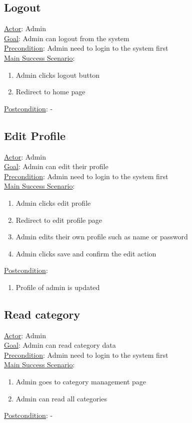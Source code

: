 \documentclass[12pt,oneside,openright,a4paper]{cpe-english-project}
\begin{document}
\subsection{Logout}
\underline{Actor}: Admin\\
\underline{Goal}: Admin can logout from the system\\
\underline{Precondition}: Admin need to login to the system first\\
\underline{Main Success Scenario}:
\begin{enumerate}[label={\arabic*.}]
	\item Admin clicks logout button      
	\item Redirect to home page
\end{enumerate}
\underline{Postcondition}: -

\subsection{Edit Profile}
\underline{Actor}: Admin\\
\underline{Goal}: Admin can edit their profile\\
\underline{Precondition}: Admin need to login to the system first\\
\underline{Main Success Scenario}:
\begin{enumerate}[label={\arabic*.}]
	\item Admin clicks edit profile       
	\item Redirect to edit profile page
	\item Admin edits their own profile such as name or password
	\item Admin clicks save and confirm the edit action
\end{enumerate}
\underline{Postcondition}: 
\begin{enumerate}[label={\arabic*.}]
	\item Profile of admin is updated
\end{enumerate}

\subsection{Read category}
\underline{Actor}: Admin\\
\underline{Goal}: Admin can read category data\\
\underline{Precondition}: Admin need to login to the system first\\
\underline{Main Success Scenario}:
\begin{enumerate}[label={\arabic*.}]
	\item Admin goes to category management page      
	\item Admin can read all categories
\end{enumerate}
\underline{Postcondition}: -
\end{document}
